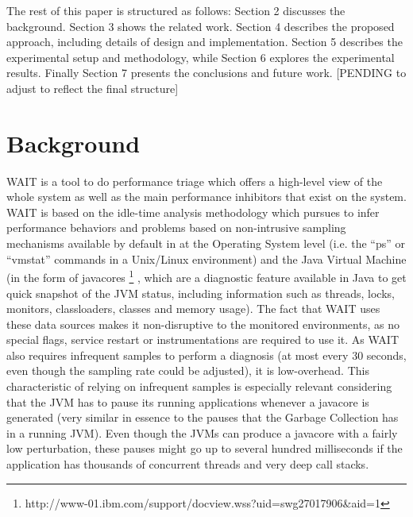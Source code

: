 \documentclass[runningheads,a4paper]{llncs}
\begin{document}
The rest of this paper is structured as follows: Section 2 discusses the
background. Section 3 shows the related work. Section 4 describes the proposed
approach, including details of design and implementation. Section 5 describes
the experimental setup and methodology, while Section 6 explores the
experimental results. Finally Section 7 presents the conclusions and future
work. [PENDING to adjust to reflect the final structure]



\section{Background}

WAIT is a tool to do performance triage which offers a high-level view of
the whole system as well as the main performance inhibitors that exist on the
system. WAIT is based on the idle-time analysis methodology \cite{Altman2010}
which pursues to infer performance behaviors and problems based on non-intrusive sampling mechanisms
available by default in at the Operating System level (i.e. the ``ps'' or
``vmstat'' commands in a Unix/Linux environment) and the Java Virtual Machine
(in the form of javacores
\footnote{http://www-01.ibm.com/support/docview.wss?uid=swg27017906\&aid=1}
, which are a diagnostic feature available in Java to get quick snapshot of the
JVM status, including information such as threads, locks, monitors,
classloaders, classes and memory usage). The fact that WAIT uses these data
sources makes it non-disruptive to the monitored environments, as no special flags, 
service restart or instrumentations are required to use it. As WAIT also
requires infrequent samples to perform a diagnosis (at most every 30 seconds,
even though the sampling rate could be adjusted), it is low-overhead. This
characteristic of relying on infrequent samples is especially relevant considering 
that the JVM has to pause its running applications whenever a javacore is
generated (very similar in essence to the pauses that the Garbage Collection has in a 
running JVM). Even though the JVMs can produce a javacore with a fairly low
perturbation, these pauses might go up to several hundred milliseconds if the 
application has thousands of concurrent threads and very deep call stacks.
\end{document}
